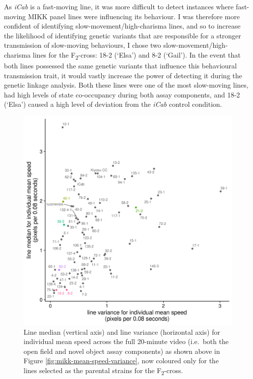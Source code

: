 \documentclass[
]{book}
\begin{document}
As \emph{\textcolor{iCab_424B4D}{iCab}} is a fast-moving line, it was more difficult to detect instances where fast-moving MIKK panel lines were influencing its behaviour. I was therefore more confident of identifying slow-movement/high-charisma lines, and so to increase the likelihood of identifying genetic variants that are responsible for a stronger transmission of slow-moving behaviours, I chose two slow-movement/high-charisma lines for the F\textsubscript{2}-cross: \textcolor{18-2 (‘Elsa’)_FF66A6}{18-2 (‘Elsa’)} and \textcolor{8-2 (‘Gail’)_FF699C}{8-2 (‘Gail’)}. In the event that both lines possessed the same genetic variants that influence this behavioural transmission trait, it would vastly increase the power of detecting it during the genetic linkage analysis. Both these lines were one of the most slow-moving lines, had high levels of state co-occupancy during both assay components, and \textcolor{18-2 (‘Elsa’)_FF66A6}{18-2 (‘Elsa’)} caused a high level of deviation from the \emph{\textcolor{iCab_424B4D}{iCab}} control condition.



\begin{figure}
\includegraphics[width=1\linewidth]{figs/mikk_behaviour/line_mean_speed_variance_selected} \caption{Line median (vertical axis) and line variance (horizontal axis) for individual mean speed across the full 20-minute video (i.e.~both the open field and novel object assay components) as shown above in Figure \ref{fig:mikk-mean-speed-variance}, now coloured only for the lines selected as the parental strains for the F\textsubscript{2}-cross.}\label{fig:F0-line-mean-speed-var-select}
\end{figure}
\end{document}
